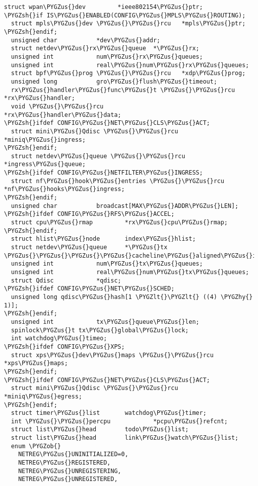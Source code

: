 \documentclass[a4paper,8pt,english]{sphinxmanual}
\def\PYGZus{\char`\_}
\def\PYGZob{\char`\{}
\def\PYGZlt{\char`\<}
\def\PYGZsh{\char`\#}
\def\PYGZhy{\char`\-}
\begin{document}
\begin{Verbatim}[commandchars=\\\{\}]
  struct wpan\PYGZus{}dev         *ieee802154\PYGZus{}ptr;
\PYGZsh{}if IS\PYGZus{}ENABLED(CONFIG\PYGZus{}MPLS\PYGZus{}ROUTING);
  struct mpls\PYGZus{}dev \PYGZus{}\PYGZus{}rcu   *mpls\PYGZus{}ptr;
\PYGZsh{}endif;
  unsigned char           *dev\PYGZus{}addr;
  struct netdev\PYGZus{}rx\PYGZus{}queue  *\PYGZus{}rx;
  unsigned int            num\PYGZus{}rx\PYGZus{}queues;
  unsigned int            real\PYGZus{}num\PYGZus{}rx\PYGZus{}queues;
  struct bpf\PYGZus{}prog \PYGZus{}\PYGZus{}rcu   *xdp\PYGZus{}prog;
  unsigned long           gro\PYGZus{}flush\PYGZus{}timeout;
  rx\PYGZus{}handler\PYGZus{}func\PYGZus{}t \PYGZus{}\PYGZus{}rcu *rx\PYGZus{}handler;
  void \PYGZus{}\PYGZus{}rcu              *rx\PYGZus{}handler\PYGZus{}data;
\PYGZsh{}ifdef CONFIG\PYGZus{}NET\PYGZus{}CLS\PYGZus{}ACT;
  struct mini\PYGZus{}Qdisc \PYGZus{}\PYGZus{}rcu *miniq\PYGZus{}ingress;
\PYGZsh{}endif;
  struct netdev\PYGZus{}queue \PYGZus{}\PYGZus{}rcu *ingress\PYGZus{}queue;
\PYGZsh{}ifdef CONFIG\PYGZus{}NETFILTER\PYGZus{}INGRESS;
  struct nf\PYGZus{}hook\PYGZus{}entries \PYGZus{}\PYGZus{}rcu *nf\PYGZus{}hooks\PYGZus{}ingress;
\PYGZsh{}endif;
  unsigned char           broadcast[MAX\PYGZus{}ADDR\PYGZus{}LEN];
\PYGZsh{}ifdef CONFIG\PYGZus{}RFS\PYGZus{}ACCEL;
  struct cpu\PYGZus{}rmap         *rx\PYGZus{}cpu\PYGZus{}rmap;
\PYGZsh{}endif;
  struct hlist\PYGZus{}node       index\PYGZus{}hlist;
  struct netdev\PYGZus{}queue     *\PYGZus{}tx \PYGZus{}\PYGZus{}\PYGZus{}\PYGZus{}cacheline\PYGZus{}aligned\PYGZus{}in\PYGZus{}smp;
  unsigned int            num\PYGZus{}tx\PYGZus{}queues;
  unsigned int            real\PYGZus{}num\PYGZus{}tx\PYGZus{}queues;
  struct Qdisc            *qdisc;
\PYGZsh{}ifdef CONFIG\PYGZus{}NET\PYGZus{}SCHED;
  unsigned long qdisc\PYGZus{}hash[1 \PYGZlt{}\PYGZlt{} ((4) \PYGZhy{} 1)];
\PYGZsh{}endif;
  unsigned int            tx\PYGZus{}queue\PYGZus{}len;
  spinlock\PYGZus{}t tx\PYGZus{}global\PYGZus{}lock;
  int watchdog\PYGZus{}timeo;
\PYGZsh{}ifdef CONFIG\PYGZus{}XPS;
  struct xps\PYGZus{}dev\PYGZus{}maps \PYGZus{}\PYGZus{}rcu *xps\PYGZus{}maps;
\PYGZsh{}endif;
\PYGZsh{}ifdef CONFIG\PYGZus{}NET\PYGZus{}CLS\PYGZus{}ACT;
  struct mini\PYGZus{}Qdisc \PYGZus{}\PYGZus{}rcu *miniq\PYGZus{}egress;
\PYGZsh{}endif;
  struct timer\PYGZus{}list       watchdog\PYGZus{}timer;
  int \PYGZus{}\PYGZus{}percpu            *pcpu\PYGZus{}refcnt;
  struct list\PYGZus{}head        todo\PYGZus{}list;
  struct list\PYGZus{}head        link\PYGZus{}watch\PYGZus{}list;
  enum \PYGZob{}
    NETREG\PYGZus{}UNINITIALIZED=0,
    NETREG\PYGZus{}REGISTERED,
    NETREG\PYGZus{}UNREGISTERING,
    NETREG\PYGZus{}UNREGISTERED,

\end{Verbatim}
\end{document}
